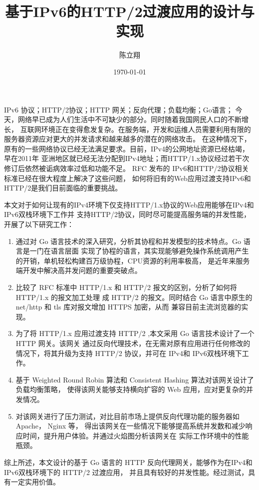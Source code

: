 \documentclass[twoside]{CUGThesis}
\title{基于IPv6的HTTP/2过渡应用的设计与实现} %
\author{陈立翔} %
\date{\today} %
\begin{document}
	\maketitle
	\makestatement

	\begin{cnabstract}{IPv6 协议；HTTP/2协议；HTTP 网关；反向代理；负载均衡；Go语言；}
		今天，网络早已成为人们生活中不可缺少的部分。同时随着我国网民人口的不断增长，
	互联网环境正在变得愈发复杂。在服务端，开发和运维人员需要利用有限的服务器资源应对更大的并发请求和越来越多的潜在的网络攻击。
	在这种情况下，原有的一些网络协议已经无法满足要求。目前，IPv4的公网地址资源已经枯竭，早在2011年
	亚洲地区就已经无法分配到IPv4地址；而HTTP/1.x协议经过若干次修订后依然被诟病效率过低和功能不足。
	RFC 发布的 IPv6和HTTP/2协议相关标准已经在很大程度上解决了这些问题，
	如何将旧有的Web应用过渡支持IPv6和HTTP/2是我们目前面临的重要挑战。\par
		本文对于如何让现有的IPv4环境下仅支持HTTP/1.x协议的Web应用能够在IPv4和IPv6双栈环境下工作并
	支持HTTP/2协议，同时尽可能提高服务端的并发性能，开展了以下研究工作：
	\begin{enumerate}
		\item 通过对 Go 语言技术的深入研究，分析其协程和并发模型的技术特点。Go 语言是一门在语言层面
		实现了协程的语言，其实现能够避免操作系统调用产生的开销，单机轻松构建百万级协程，CPU资源的利用率极高，
		是近年来服务端开发中解决高并发问题的重要突破点。
		\item 比较了 RFC 标准中 HTTP/1.x 和 HTTP/2 报文的区别，分析了如何将 HTTP/1.x 的报文加工处理
		成 HTTP/2 的报文。同时结合 Go 语言中原生的 net/http 和 tls 库对报文增加 HTTPS 加密，从而
		兼容目前主流浏览器的实现。
		\item 为了将 HTTP/1.x 应用过渡支持 HTTP/2 ,本文采用 Go 语言技术设计了一个 HTTP 网关。该网关
		通过反向代理技术，在无需对原有应用进行任何修改的情况下，将其升级为支持 HTTP/2 协议，并可在 IPv4和
		IPv6双栈环境下工作。
		\item 基于 Weighted Round Robin 算法和 Consistent Hashing 算法对该网关设计了负载均衡策略，
		使得该网关能够支持横向扩容的 Web 应用，应对更复杂的并发情况。
		\item 对该网关进行了压力测试，对比目前市场上提供反向代理功能的服务器如 Apache， Nginx 等，
		得出该网关在一些情况下能够提高系统并发数和减少响应时间，提升用户体验。并通过火焰图分析该网关在
		实际工作环境中的性能瓶颈。
	\end{enumerate}
		\par
		综上所述，本文设计的基于 Go 语言的 HTTP 反向代理网关，能够作为在IPv4和IPv6双栈环境下的 HTTP/2 过渡应用，
	并且具有较好的并发性能。经过测试，具有一定实用价值。
	\end{cnabstract}
	
\end{document}
